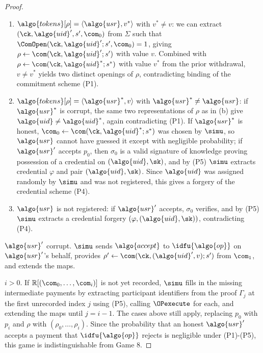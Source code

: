 \begin{proof}
\begin{enumerate}[label=\alph*)]
  \item $\algo{tokens}[\rho] = \langle \algo{usr}, v^* \rangle$ with $v^* \neq
    v$: we can extract $(\ck, \algo{uid}', s', \com_0)$ from $\Sigma$ such that
    $\ComOpen(\ck, \algo{uid}'; s', \com_0) = 1$, giving $\rho \leftarrow
    \com(\ck, \algo{uid}'; s')$ with value $v$. Combined with $\rho \leftarrow
    \com(\ck, \algo{uid}^*; s^*)$ with value $v^*$ from the prior withdrawal,
    $v \neq v^*$ yields two distinct openings of $\rho$, contradicting binding
    of the commitment scheme (P1).

  \item $\algo{tokens}[\rho] = \langle \algo{usr}^*, v \rangle$ with
    $\algo{usr}^* \neq \algo{usr}$: if $\algo{usr}^*$ is corrupt, the same two
    representations of $\rho$ as in (b) give $\algo{uid} \neq \algo{uid}^*$,
    again contradicting (P1). If $\algo{usr}^*$ is honest, $\com_0 \leftarrow
    \com(\ck, \algo{uid}^*; s^*)$ was chosen by $\simu$, so $\algo{usr}$ cannot
    have guessed it except with negligible probability; if $\algo{usr}'$
    accepts $p_0$, then $\sigma_0$ is a valid signature of knowledge proving
    possession of a credential on $(\algo{uid}, \sk)$, and by (P5) $\simu$
    extracts credential $\varphi$ and pair $(\algo{uid}, \sk)$. Since
    $\algo{uid}$ was assigned randomly by $\simu$ and was not registered, this
    gives a forgery of the credential scheme (P4).

  \item $\algo{usr}$ is not registered: if $\algo{usr}'$ accepts, $\sigma_0$
    verifies, and by (P5) $\simu$ extracts a credential forgery $(\varphi,
    (\algo{uid}, \sk))$, contradicting (P4).

\end{enumerate}

$\algo{usr}'$ corrupt. $\simu$ sends $\algo{accept}$ to $\idfu{\algo{op}}$ on
$\algo{usr}'$'s behalf, provides $\rho' \leftarrow \com(\ck, (\algo{uid}', v);
s')$ from $\com_1$, and extends the maps.

$i > 0$. If $\mathbb{R}[(\com_0, \ldots, \com_i)]$ is not yet recorded, $\simu$
fills in the missing intermediate payments by extracting participant
identifiers from the proof $\Gamma_j$ at the first unrecorded index $j$ using
(P5), calling $\OPexecute$ for each, and extending the maps until $j = i - 1$.
The cases above still apply, replacing $p_0$ with $p_i$ and $\rho$ with
$(\rho_0, \ldots, \rho_i)$. Since the probability that an honest $\algo{usr}'$
accepts a payment that $\idfu{\algo{op}}$ rejects is negligible under (P1)-(P5), this
game is indistinguishable from Game 8.


\end{proof}
